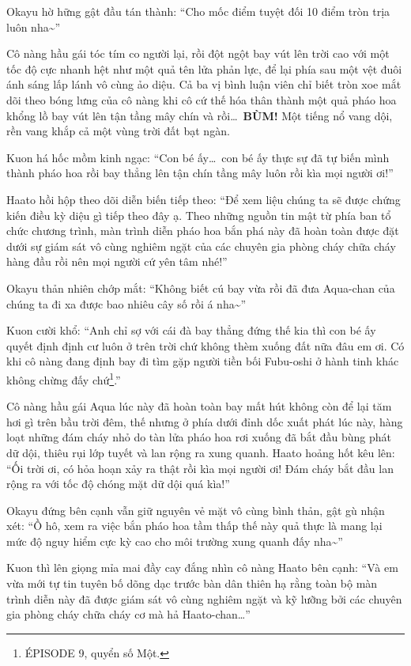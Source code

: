 \documentclass[../main.tex]{subfiles}
\begin{document}
Okayu hờ hững gật đầu tán thành: ``Cho mốc điểm tuyệt đối 10 điểm tròn trịa luôn nha\~{}''

Cô nàng hầu gái tóc tím co người lại, rồi đột ngột bay vút lên trời cao với một tốc độ cực nhanh hệt như một quả tên lửa phản lực, để lại phía sau một vệt đuôi ánh sáng lấp lánh vô cùng ảo diệu. Cả ba vị bình luận viên chỉ biết tròn xoe mắt dõi theo bóng lưng của cô nàng khi cô cứ thế hóa thân thành một quả pháo hoa khổng lồ bay vút lên tận tầng mây chín và rồi\dots\ \textbf{BÙM!} Một tiếng nổ vang dội, rền vang khắp cả một vùng trời đất bạt ngàn.

Kuon há hốc mồm kinh ngạc: ``Con bé ấy\dots\ con bé ấy thực sự đã tự biến mình thành pháo hoa rồi bay thẳng lên tận chín tầng mây luôn rồi kìa mọi người ơi!''

Haato hồi hộp theo dõi diễn biến tiếp theo: ``Để xem liệu chúng ta sẽ được chứng kiến điều kỳ diệu gì tiếp theo đây ạ. Theo những nguồn tin mật từ phía ban tổ chức chương trình, màn trình diễn pháo hoa bắn phá này đã hoàn toàn được đặt dưới sự giám sát vô cùng nghiêm ngặt của các chuyên gia phòng cháy chữa cháy hàng đầu rồi nên mọi người cứ yên tâm nhé!''

Okayu thản nhiên chớp mắt: ``Không biết cú bay vừa rồi đã đưa Aqua-chan của chúng ta đi xa được bao nhiêu cây số rồi á nha\~{}''

Kuon cười khổ: ``Anh chỉ sợ với cái đà bay thẳng đứng thế kia thì con bé ấy quyết định định cư luôn ở trên trời chứ không thèm xuống đất nữa đâu em ơi. Có khi cô nàng đang định bay đi tìm gặp người tiền bối Fubu-oshi ở hành tinh khác không chừng đấy chứ\footnote{{\flaregothic ÉPISODE 9}, quyển số Một.}.''

Cô nàng hầu gái Aqua lúc này đã hoàn toàn bay mất hút không còn để lại tăm hơi gì trên bầu trời đêm, thế nhưng ở phía dưới đỉnh dốc xuất phát lúc này, hàng loạt những đám cháy nhỏ do tàn lửa pháo hoa rơi xuống đã bắt đầu bùng phát dữ dội, thiêu rụi lớp tuyết và lan rộng ra xung quanh. Haato hoảng hốt kêu lên: ``Ối trời ơi, có hỏa hoạn xảy ra thật rồi kìa mọi người ơi! Đám cháy bắt đầu lan rộng ra với tốc độ chóng mặt dữ dội quá kìa!''

Okayu đứng bên cạnh vẫn giữ nguyên vẻ mặt vô cùng bình thản, gật gù nhận xét: ``Ồ hô, xem ra việc bắn pháo hoa tầm thấp thế này quả thực là mang lại mức độ nguy hiểm cực kỳ cao cho môi trường xung quanh đấy nha\~{}''

Kuon thì lên giọng mỉa mai đầy cay đắng nhìn cô nàng Haato bên cạnh: ``Và em vừa mới tự tin tuyên bố dõng dạc trước bàn dân thiên hạ rằng toàn bộ màn trình diễn này đã được giám sát vô cùng nghiêm ngặt và kỹ lưỡng bởi các chuyên gia phòng cháy chữa cháy cơ mà hả Haato-chan\dots''
\end{document}
